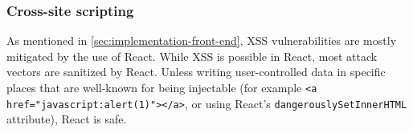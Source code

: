 \subsubsection{Cross-site scripting}
As mentioned in \cref{sec:implementation-front-end}, XSS vulnerabilities are
mostly mitigated by the use of React. While XSS is possible in React, most
attack vectors are sanitized by React. Unless writing user-controlled data in
specific places that are well-known for being injectable (for example
\texttt{<a href="javascript:alert(1)"></a>}, or using React's
\texttt{dangerouslySetInnerHTML} attribute), React is safe.

